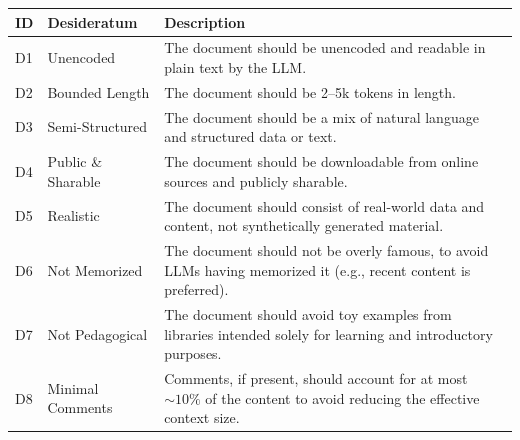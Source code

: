 \centering
\begin{tabular}{@{}lp{5cm}p{7.5cm}@{}}
\toprule
\textbf{ID} & \textbf{Desideratum} & \textbf{Description} \\
\midrule
D1 & Unencoded & The document should be unencoded and readable in plain text by the LLM. \\
D2 & Bounded Length & The document should be 2--5k tokens in length. \\
D3 & Semi-Structured & The document should be a mix of natural language and structured data or text. \\
D4 & Public \& Sharable & The document should be downloadable from online sources and publicly sharable. \\
D5 & Realistic & The document should consist of real-world data and content, not synthetically generated material. \\
D6 & Not Memorized & The document should not be overly famous, to avoid LLMs having memorized it (e.g., recent content is preferred). \\
D7 & Not Pedagogical & The document should avoid toy examples from libraries intended solely for learning and introductory purposes. \\
D8 & Minimal Comments & Comments, if present, should account for at most ${\sim}10\%$ of the content to avoid reducing the effective context size. \\
\bottomrule
\end{tabular}
